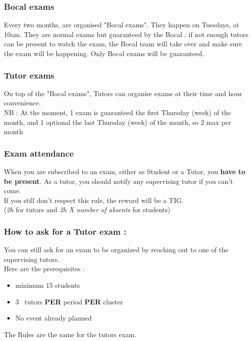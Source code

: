 \documentclass{article}
\begin{document}
\subsubsection{Bocal exams}

Every two months, are organised "Bocal exams". They happen on Tuesdays, at 10am. They are normal exams but guaranteed by the Bocal : if not enough tutors can be present to watch the exam, the Bocal team will take over and make sure the exam will be happening. 
Only Bocal exams will be guaranteed.

\subsubsection{Tutor exams}

On top of the "Bocal exams", Tutors can organise exams at their time and hour convenience. \\
NB : At the moment, 1 exam is guaranteed the first Thursday (week) of the month, and 1 optional the last Thursday (week) of the month, so 2 max per month

\subsubsection{Exam attendance}
When you are subscribed to an exam, either as Student or a Tutor, you \textbf{have to be present}.
As a tutor, you should notify any supervising tutor if you can't come. \\
If you still don't respect this rule, the reward will be a TIG. \\
(\textit{2h} for tutors and \textit{2h X number of absents} for students)

\subsubsection{How to ask for a Tutor exam : }
You can still ask for an exam to be organized by reaching out to one of the supervising tutors. \\
Here are the prerequisites :
\begin{itemize}
    \item minimum 15 students
    \item 3~ tutors \textbf{PER} period \textbf{PER} cluster
    \item No event already planned
\end{itemize}
The Rules are the same for the tutors exam. \\
\end{document}
